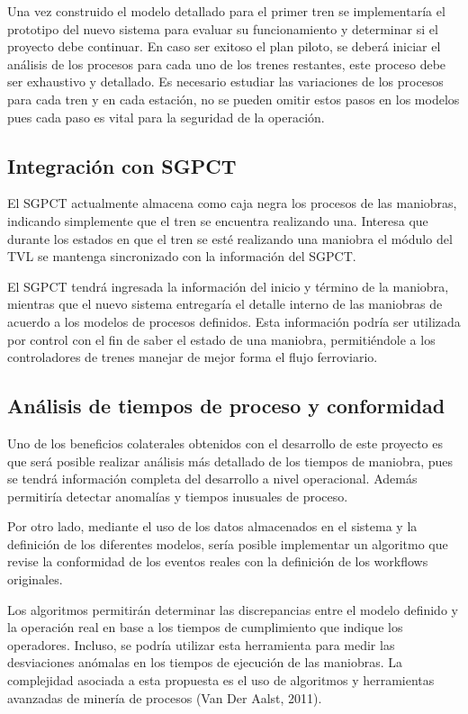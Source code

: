 \documentclass[oneside,12pt, letterpaper, titlepage]{book}
\begin{document}
Una vez construido el modelo detallado para el primer tren se implementaría el prototipo del nuevo sistema para evaluar su funcionamiento y determinar si el proyecto debe continuar. En caso ser exitoso el plan piloto, se deberá iniciar el análisis de los procesos para cada uno de los trenes restantes, este proceso debe ser exhaustivo y detallado. Es necesario estudiar las variaciones de los procesos para cada tren y en cada estación, no se pueden omitir estos pasos en los modelos pues cada paso es vital para la seguridad de la operación. 

\subsection{Integración con SGPCT}
El SGPCT actualmente almacena como caja negra los procesos de las maniobras, indicando simplemente que el tren se encuentra realizando una. Interesa que durante los estados en que el tren se esté realizando una maniobra el módulo del TVL se mantenga sincronizado con la información del SGPCT.

El SGPCT tendrá ingresada la información del inicio y término de la maniobra, mientras que el nuevo sistema entregaría el detalle interno de las maniobras de acuerdo a los modelos de procesos definidos. Esta información podría ser utilizada por control con el fin de saber el estado de una maniobra, permitiéndole a los controladores de trenes manejar de mejor forma el flujo ferroviario.

\subsection{Análisis de tiempos de proceso y conformidad}
Uno de los beneficios colaterales obtenidos con el desarrollo de este proyecto es que será posible realizar análisis más detallado de los tiempos de maniobra, pues se tendrá información completa del desarrollo a nivel operacional. Además permitiría detectar anomalías y tiempos inusuales de proceso.

Por otro lado, mediante el uso de los datos almacenados en el sistema y la definición de los diferentes modelos, sería posible implementar un algoritmo que revise la conformidad de los eventos reales con la definición de los workflows originales.

Los algoritmos permitirán determinar las discrepancias entre el modelo definido y la operación real en base a los tiempos de cumplimiento que indique los operadores. Incluso, se podría utilizar esta herramienta para medir las desviaciones anómalas en los tiempos de ejecución de las maniobras. La complejidad asociada a esta propuesta es el uso de algoritmos y herramientas avanzadas de minería de procesos (Van Der Aalst, 2011).
\end{document}
